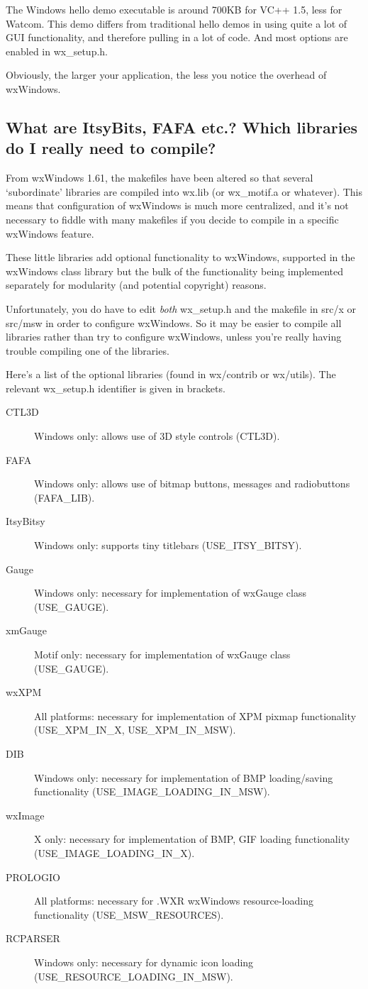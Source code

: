 The Windows hello demo executable is around 700KB for VC++ 1.5, less for
Watcom. This demo differs from traditional hello demos in using quite a
lot of GUI functionality, and therefore pulling in a lot of code.
And most options are enabled in wx\_setup.h. 

Obviously, the larger your application, the less you notice the overhead
of wxWindows.

\subsection{What are ItsyBits, FAFA etc.? Which libraries do I really need to compile?}

From wxWindows 1.61, the makefiles have been altered so that several
`subordinate' libraries are compiled into wx.lib (or wx\_motif.a or
whatever). This means that configuration of wxWindows is much more
centralized, and it's not necessary to fiddle with many makefiles if you
decide to compile in a specific wxWindows feature.

These little libraries add optional functionality to wxWindows,
supported in the wxWindows class library but the bulk of the
functionality being implemented separately for modularity (and potential
copyright) reasons.

Unfortunately, you do have to edit {\it both} wx\_setup.h and the makefile
in src/x or src/msw in order to configure wxWindows. So it
may be easier to compile all libraries rather than try to configure
wxWindows, unless you're really having trouble compiling one of
the libraries.

Here's a list of the optional libraries (found in wx/contrib or wx/utils).
The relevant wx\_setup.h identifier is given in brackets.

\begin{description}
\item[CTL3D] Windows only: allows use of 3D style controls (CTL3D).
\item[FAFA] Windows only: allows use of bitmap buttons, messages and radiobuttons (FAFA\_LIB).
\item[ItsyBitsy] Windows only: supports tiny titlebars (USE\_ITSY\_BITSY).
\item[Gauge] Windows only: necessary for implementation of wxGauge class (USE\_GAUGE).
\item[xmGauge] Motif only: necessary for implementation of wxGauge class (USE\_GAUGE).
\item[wxXPM] All platforms: necessary for implementation of XPM pixmap functionality (USE\_XPM\_IN\_X, USE\_XPM\_IN\_MSW).
\item[DIB] Windows only: necessary for implementation of BMP loading/saving functionality (USE\_IMAGE\_LOADING\_IN\_MSW).
\item[wxImage] X only: necessary for implementation of BMP, GIF loading functionality (USE\_IMAGE\_LOADING\_IN\_X).
\item[PROLOGIO] All platforms: necessary for .WXR wxWindows resource-loading functionality (USE\_MSW\_RESOURCES).
\item[RCPARSER] Windows only: necessary for dynamic icon loading (USE\_RESOURCE\_LOADING\_IN\_MSW).
\end{description}

